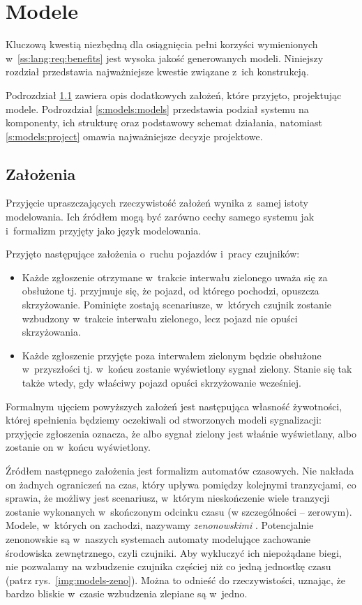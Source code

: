 \documentclass{pracamgr}
\newcommand{\imgr}[1]{rys.~\ref{#1}}
\theoremstyle{plain}
\begin{document}
\chapter{Modele}
Kluczową kwestią niezbędną dla osiągnięcia pełni korzyści wymienionych
w~\ref{ss:lang:req:benefits} jest wysoka jakość generowanych
modeli. Niniejszy rozdział przedstawia najważniejsze kwestie związane
z~ich konstrukcją.

Podrozdział \ref{s:models:assumptions} zawiera opis dodatkowych
założeń, które przyjęto, projektując modele. Podrozdział
\ref{s:models:models} przedstawia podział systemu na komponenty, ich
strukturę oraz podstawowy schemat działania, natomiast
\ref{s:models:project} omawia najważniejsze decyzje projektowe.

\section{Założenia}
\label{s:models:assumptions}

Przyjęcie upraszczających rzeczywistość założeń wynika z~samej istoty
modelowania. Ich źródłem mogą być zarówno cechy samego systemu jak
i~formalizm przyjęty jako język modelowania.

Przyjęto następujące założenia o~ruchu pojazdów i~pracy czujników:
\begin{itemize}
  \item Każde zgłoszenie otrzymane w~trakcie interwału zielonego uważa
  się za obsłużone tj. przyjmuje się, że pojazd, od którego pochodzi,
  opuszcza skrzyżowanie. Pominięte zostają scenariusze, w~których
  czujnik zostanie wzbudzony w~trakcie interwału zielonego, lecz
  pojazd nie opuści skrzyżowania.
  \item Każde zgłoszenie przyjęte poza interwałem zielonym będzie
  obsłużone w~przyszłości tj. w~końcu zostanie wyświetlony sygnał
  zielony. Stanie się tak także wtedy, gdy właściwy pojazd opuści
  skrzyżowanie wcześniej. 
\end{itemize}
Formalnym ujęciem powyższych założeń jest następująca własność
żywotności, której spełnienia będziemy oczekiwali od stworzonych
modeli sygnalizacji: przyjęcie zgłoszenia oznacza, że albo sygnał
zielony jest właśnie wyświetlany, albo zostanie on w~końcu
wyświetlony.

Źródłem następnego założenia jest formalizm automatów czasowych. Nie
nakłada on żadnych ograniczeń na czas, który upływa pomiędzy kolejnymi
tranzycjami, co sprawia, że możliwy jest scenariusz, w~którym
nieskończenie wiele tranzycji zostanie wykonanych w~skończonym odcinku
czasu (w szczególności -- zerowym). Modele, w~których on zachodzi,
nazywamy \emph{zenonowskimi} \cite{henz-94}.  Potencjalnie zenonowskie
są w~naszych systemach automaty modelujące zachowanie środowiska
zewnętrznego, czyli czujniki. Aby wykluczyć ich niepożądane biegi, nie
pozwalamy na wzbudzenie czujnika częściej niż co jedną jednostkę czasu
(patrz \imgr{img:models-zeno}). Można to odnieść do rzeczywistości,
uznając, że bardzo bliskie w~czasie wzbudzenia zlepiane są w~jedno.
\end{document}
